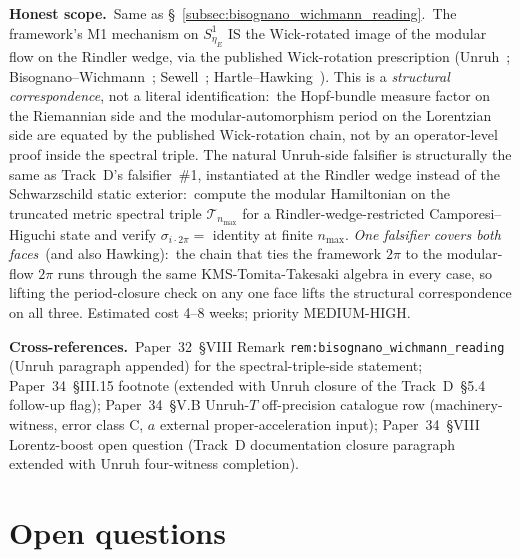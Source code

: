 \documentclass[11pt]{article}
\begin{document}
\textbf{Honest scope.}\ Same as
\S~\ref{subsec:bisognano_wichmann_reading}.\ The framework's M1
mechanism on $S^1_{\eta_E}$ IS the Wick-rotated image of the modular
flow on the Rindler wedge, via the published Wick-rotation prescription
(Unruh~\cite{unruh1976}; Bisognano--Wichmann~\cite{bisognano_wichmann1976};
Sewell~\cite{sewell1982}; Hartle--Hawking~\cite{hartle_hawking1976}).
This is a \emph{structural correspondence}, not a literal identification:\
the Hopf-bundle measure factor on the Riemannian side and the
modular-automorphism period on the Lorentzian side are equated by the
published Wick-rotation chain, not by an operator-level proof inside
the spectral triple.  The natural Unruh-side falsifier is structurally
the same as Track~D's falsifier~\#1, instantiated at the Rindler wedge
instead of the Schwarzschild static exterior:\ compute the modular
Hamiltonian on the truncated metric spectral triple
$\mathcal{T}_{n_{\max}}$ for a Rindler-wedge-restricted
Camporesi--Higuchi state and verify $\sigma_{i\cdot 2\pi} = $ identity
at finite $n_{\max}$.  \emph{One falsifier covers both faces}\ (and
also Hawking):\ the chain that ties the framework $2\pi$ to the
modular-flow $2\pi$ runs through the same KMS-Tomita-Takesaki algebra
in every case, so lifting the period-closure check on any one face
lifts the structural correspondence on all three.  Estimated cost
4--8 weeks; priority MEDIUM-HIGH.

\textbf{Cross-references.}\ Paper~32~§VIII Remark
\texttt{rem:bisognano\_wichmann\_reading} (Unruh paragraph appended)
for the spectral-triple-side statement;
Paper~34~§III.15 footnote (extended with Unruh closure of the
Track~D~§5.4 follow-up flag); Paper~34~§V.B Unruh-$T$ off-precision
catalogue row (machinery-witness, error class C, $a$ external
proper-acceleration input);
Paper~34~§VIII Lorentz-boost open question (Track~D documentation
closure paragraph extended with Unruh four-witness completion).

\section{Open questions}
\label{sec:open}
\end{document}
